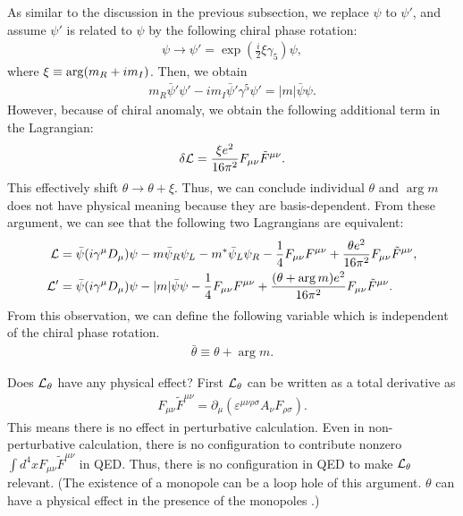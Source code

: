\documentclass[11pt,a4paper]{article}
\begin{document}
As similar to the discussion in the previous subsection, we replace $\psi$ to $\psi'$, and assume $\psi'$ is related to $\psi$ by the following chiral phase rotation:
\begin{align}
    \psi \to \psi' = \exp\left( \frac{i}{2} \xi \gamma_5 \right) \psi,
\end{align}
where $\xi \equiv {\rm arg}(m_R + i m_I)$. Then, we obtain
\begin{align}
    m_R \bar\psi' \psi' - i m_I \bar\psi' \gamma^5 \psi' = |m| \bar\psi \psi.
\end{align}
However, because of chiral anomaly, we obtain the following additional term in the Lagrangian:
\begin{align}
    \delta{\cal L} = \frac{\xi e^2}{16\pi^2} F_{\mu\nu} \tilde F^{\mu\nu}.
\end{align}
This effectively shift $\theta \to \theta + \xi$.
Thus, we can conclude individual $\theta$ and $\arg m$ does not have physical meaning because they are basis-dependent.
From these argument, we can see that the following two Lagrangians are equivalent:
\begin{align}
    {\cal L} &= \bar\psi (i\gamma^\mu D_\mu) \psi - m \bar\psi_R \psi_L - m^* \bar\psi_L \psi_R - \frac{1}{4}F_{\mu\nu} F^{\mu\nu} + \frac{\theta e^2}{16\pi^2} F_{\mu\nu} \tilde F^{\mu\nu}, \\
    {\cal L}' &= \bar\psi (i\gamma^\mu D_\mu) \psi - |m| \bar\psi \psi - \frac{1}{4}F_{\mu\nu} F^{\mu\nu} + \frac{(\theta + \arg m) e^2}{16\pi^2} F_{\mu\nu} \tilde F^{\mu\nu}.
\end{align}
From this observation, we can define the following variable which is independent of the chiral phase rotation.
\begin{align}
    \bar\theta \equiv \theta + \arg m.
\end{align}

Does ${\cal L}_\theta$ have any physical effect? First ${\cal L}_\theta$ can be written as a total derivative as
\begin{align}
    F_{\mu\nu} \tilde F^{\mu\nu} = \partial_\mu ( \varepsilon^{\mu\nu\rho\sigma} A_\nu F_{\rho\sigma} ).
\end{align}
This means there is no effect in perturbative calculation.
Even in non-perturbative calculation, there is no configuration to contribute nonzero $\int d^4 x F_{\mu\nu} \tilde F^{\mu\nu}$ in QED.
Thus, there is no configuration in QED to make ${\cal L}_\theta$ relevant.
(The existence of a monopole can be a loop hole of this argument. $\theta$ can have a physical effect in the presence of the monopoles \cite{Witten:1979ey, Fan:2021ntg}.)
\end{document}

